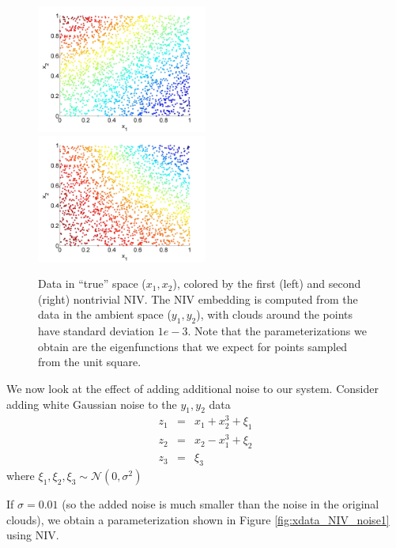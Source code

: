 \documentclass[12pt]{article}
\begin{document}
\begin{figure}[htb]
\includegraphics[width=0.5\textwidth]{xdata_colored_NIV1}
\includegraphics[width=0.5\textwidth]{xdata_colored_NIV2}
\caption{Data in ``true'' space ($x_1, x_2$), colored by the first (left) and second (right) nontrivial NIV. The NIV embedding is computed from the data in the ambient space ($y_1, y_2$), with clouds around the points have standard deviation $1e-3$. Note that the parameterizations we obtain are the eigenfunctions that we expect for points sampled from the unit square.}
\label{fig:xdata_NIV}
\end{figure}

We now look at the effect of adding additional noise to our system.
%
Consider adding white Gaussian noise to the $y_1, y_2$ data
\begin{eqnarray}
z_1 & = & x_1 + x_2^3 + \xi_1 \\
z_2 & = & x_2 - x_1^3 + \xi_2 \\
z_3 & = & \xi_3
\end{eqnarray}
where $\xi_1, \xi_2, \xi_3 \sim \mathcal{N}(0, \sigma^2)$

If $\sigma = 0.01$ (so the added noise is much smaller than the noise in the original clouds), we obtain a parameterization shown in Figure \ref{fig:xdata_NIV_noise1} using NIV.
\end{document}
